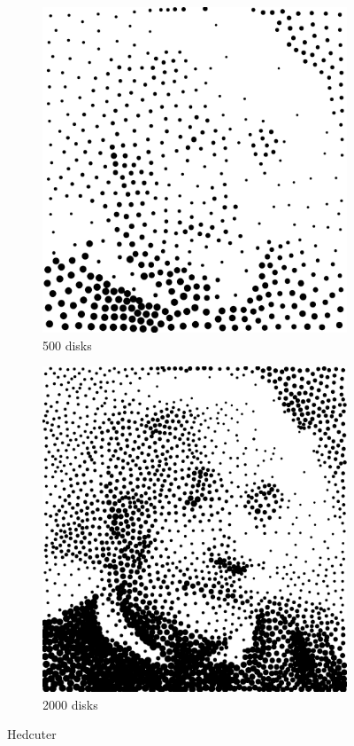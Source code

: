 \documentclass[11pt]{article}
\begin{document}
\begin{enumerate}
\begin{figure}[H]
    \centering
        \begin{subfigure}{0.4\textwidth}
        \centering
        \includegraphics[width=\textwidth]{../results/hedcuter/2-1.pdf}
         \caption{500 disks}
    \end{subfigure}
    \begin{subfigure}{0.4\textwidth}
        \centering
        \includegraphics[width=\textwidth]{../results/hedcuter/2-2.pdf}
         \caption{2000 disks}
    \end{subfigure}
    \label{fig:1}
        \caption{Hedcuter}
\end{figure}


\end{enumerate}
\end{document}

